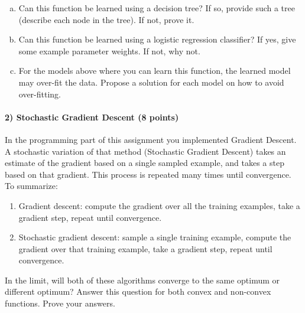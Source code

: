 \documentclass[11pt]{article}
\begin{document}
\begin{enumerate}[(a)]
\item Can this function be learned using a decision tree? If so, provide such a tree (describe each node in the tree). If not, prove it.

\item Can this function be learned using a logistic regression classifier? If yes, give some example parameter weights. If not, why not.

\item For the models above where you can learn this function, the learned model may over-fit the data. Propose a solution for each model on how to avoid over-fitting.
\end{enumerate}

\paragraph{2) Stochastic Gradient Descent (8 points)}
In the programming part of this assignment you implemented Gradient Descent. A stochastic variation of that method (Stochastic Gradient Descent) takes an estimate of the gradient based on a single sampled example, and takes a step based on that gradient. This process is repeated many times until convergence. To summarize:
\begin{enumerate}
\item Gradient descent: compute the gradient over all the training examples, take a gradient step, repeat until convergence.
\item Stochastic gradient descent: sample a single training example, compute the gradient over that training example, take a gradient step, repeat until convergence.
\end{enumerate}

In the limit, will both of these algorithms converge to the same optimum or different optimum? Answer this question for both convex and non-convex functions. Prove your answers.
\end{document}
